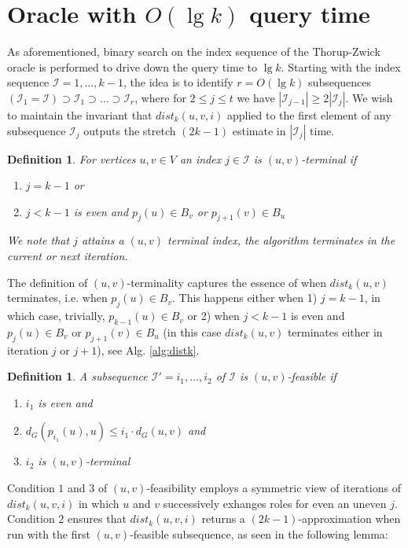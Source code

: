 \documentclass[12pt]{article}
\newtheorem{defi}[thm]{Definition}
\begin{document}
\section{Oracle with $O(\lg k)$ query time}
As aforementioned, binary search on the index sequence of the Thorup-Zwick oracle is performed to drive down the query time to $\lg k$. Starting with the index sequence $\mathcal{I}=1,\hdots,k-1$, the idea is to identify $r=O(\lg k)$ subsequences $(\mathcal{I}_1=\mathcal{I}) \supset \mathcal{I}_1 \supset \hdots \supset \mathcal{I}_r$, where for $2 \leq j \leq t$ we have $|\mathcal{I}_{j-1}| \geq 2|\mathcal{I}_j|$. We wish to maintain the invariant that $dist_k(u,v,i)$ applied to the first element of any subsequence $\mathcal{I}_j$ outputs the stretch $(2k-1)$ estimate in $|\mathcal{I}_j|$ time.
\\
\begin{defi}
For vertices $u,v \in V$ an index $j \in \mathcal{I}$ is $(u,v)$-terminal if
\begin{enumerate}
\item $j = k-1$ or
\item $j < k-1$ is even and $p_j(u) \in B_v$ or $p_{j+1}(v) \in B_u$ 
\end{enumerate}
We note that $j$ attains a $(u,v)$ terminal index, the algorithm terminates in the current or next iteration. \label{def:uvterm}
\end{defi}
The definition of $(u,v)$-terminality captures the essence of when $dist_k(u,v)$ terminates, i.e. when $p_j(u) \in B_v$. This happens either when 1) $j=k-1$, in which case, trivially, $p_{k-1}(u) \in B_v$ or 2) when $j < k-1$ is even and $p_j(u) \in B_v$ or $p_{j+1}(v) \in B_u$ (in this case $dist_k(u,v)$ terminates either in iteration $j$ or $j+1$), see Alg. \ref{alg:distk}.
\\
\begin{defi}
A subsequence $\mathcal{I'}=i_1, \hdots, i_2$ of $\mathcal{I}$ is $(u,v)$-feasible if
\begin{enumerate}
\item $i_1$ is even and
\item $d_{G}(p_{i_1}(u),u) \leq i_1 \cdot d_G(u,v)$ and
\item $i_2$ is $(u,v)$-terminal
\end{enumerate}
\label{def:uvfeas}
\end{defi}
Condition $1$ and $3$ of $(u,v)$-feasibility employs a symmetric view of iterations of $dist_k(u,v,i)$ in which $u$ and $v$ successively exhanges roles for even an uneven $j$. Condition $2$ ensures that $dist_k(u,v,i)$ returns a $(2k-1)$-approximation when run with the first $(u,v)$-feasible subsequence, as seen in the following lemma:
\end{document}
